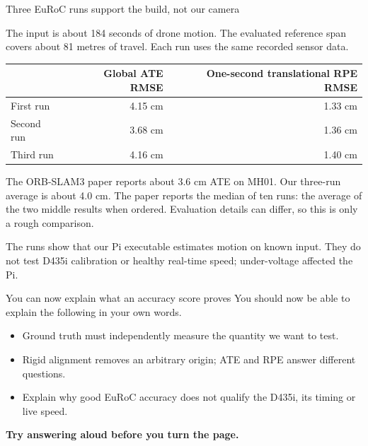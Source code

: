 \documentclass[aspectratio=169,12pt,t]{beamer}
\newcommand{\para}[1]{#1\par\medskip}
\newcommand{\lesson}[1]{\vfill{\color{teal!70!black}\bfseries #1}\par}
\begin{document}
\begin{frame}{Three EuRoC runs support the build, not our camera}

\para{The input is about 184 seconds of drone motion. The evaluated reference span covers about 81 metres of travel. Each run uses the same recorded sensor data.}
\begin{center}\begin{tabular}{lrr}\toprule
 & Global ATE RMSE & One-second translational RPE RMSE\\\midrule
First run & 4.15 cm & 1.33 cm\\
Second run & 3.68 cm & 1.36 cm\\
Third run & 4.16 cm & 1.40 cm\\\bottomrule
\end{tabular}\end{center}
\para{The ORB-SLAM3 paper reports about 3.6 cm ATE on MH01. Our three-run average is about 4.0 cm. The paper reports the median of ten runs: the average of the two middle results when ordered. Evaluation details can differ, so this is only a rough comparison.}
\para{The runs show that our Pi executable estimates motion on known input. They do not test D435i calibration or healthy real-time speed; under-voltage affected the Pi.}

\end{frame}

\begin{frame}{You can now explain what an accuracy score proves}
\para{You should now be able to explain the following in your own words.}
\begin{itemize}
\item Ground truth must independently measure the quantity we want to test.
\item Rigid alignment removes an arbitrary origin; ATE and RPE answer different questions.
\item Explain why good EuRoC accuracy does not qualify the D435i, its timing or live speed.
\end{itemize}
\lesson{Try answering aloud before you turn the page.}
\end{frame}
\end{document}

